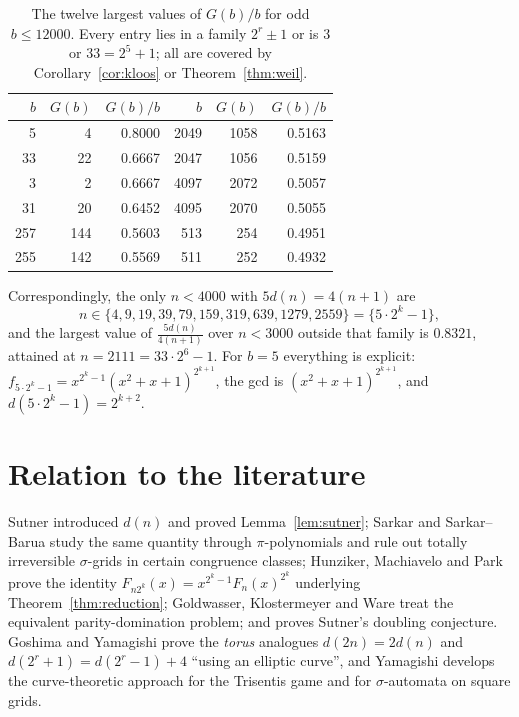\documentclass[a4paper]{article}
\theoremstyle{definition}
\begin{document}
	\begin{table}[H]
		\centering
		\begin{tabular}{|r|r|r||r|r|r|}
			\hline
			$b$ & $G(b)$ & $G(b)/b$ & $b$ & $G(b)$ & $G(b)/b$\\
			\hline\hline
			5 & 4 & 0.8000 & 2049 & 1058 & 0.5163\\ \hline
			33 & 22 & 0.6667 & 2047 & 1056 & 0.5159\\ \hline
			3 & 2 & 0.6667 & 4097 & 2072 & 0.5057\\ \hline
			31 & 20 & 0.6452 & 4095 & 2070 & 0.5055\\ \hline
			257 & 144 & 0.5603 & 513 & 254 & 0.4951\\ \hline
			255 & 142 & 0.5569 & 511 & 252 & 0.4932\\ \hline
		\end{tabular}
		\caption{The twelve largest values of $G(b)/b$ for odd $b \le 12000$. Every entry lies in a family $2^r \pm 1$ or is $3$ or $33 = 2^5+1$; all are covered by Corollary~\ref{cor:kloos} or Theorem~\ref{thm:weil}.}
	\end{table}

	Correspondingly, the only $n < 4000$ with $5d(n) = 4(n+1)$ are
	\begin{equation*}
		n \in \{4, 9, 19, 39, 79, 159, 319, 639, 1279, 2559\} = \{5\cdot 2^k - 1\},
	\end{equation*}
	and the largest value of $\frac{5 d(n)}{4(n+1)}$ over $n < 3000$ outside that family is $0.8321$, attained at $n = 2111 = 33\cdot 2^6 - 1$.
	For $b = 5$ everything is explicit: $f_{5\cdot2^k-1} = x^{2^k-1}(x^2+x+1)^{2^{k+1}}$, the gcd is $(x^2+x+1)^{2^{k+1}}$, and $d(5 \cdot 2^k - 1) = 2^{k+2}$.

	\section{Relation to the literature}\label{sec:lit}
	Sutner \cite{Sutner1989, Sutner96sigma-automataand} introduced $d(n)$ and proved Lemma~\ref{lem:sutner}; Sarkar \cite{Sarkar1996} and Sarkar--Barua \cite{SarkarBarua1998} study the same quantity through $\pi$-polynomials and rule out totally irreversible $\sigma$-grids in certain congruence classes; Hunziker, Machiavelo and Park \cite{HUNZIKER2004465} prove the identity $F_{n2^k}(x) = x^{2^k-1}F_n(x)^{2^k}$ underlying Theorem~\ref{thm:reduction}; Goldwasser, Klostermeyer and Ware \cite{GoldwasserKlostermeyerWare2002} treat the equivalent parity-domination problem; and \cite{Boyles2022} proves Sutner's doubling conjecture.
	Goshima and Yamagishi \cite{GOSHIMAYAMAGISHI2010} prove the \emph{torus} analogues $d(2n) = 2d(n)$ and $d(2^r+1) = d(2^r-1)+4$ ``using an elliptic curve'', and Yamagishi \cite{YAMAGISHI2011, YAMAGISHI2013, YAMAGISHI20151} develops the curve-theoretic approach for the Trisentis game and for $\sigma$-automata on square grids.
\end{document}
